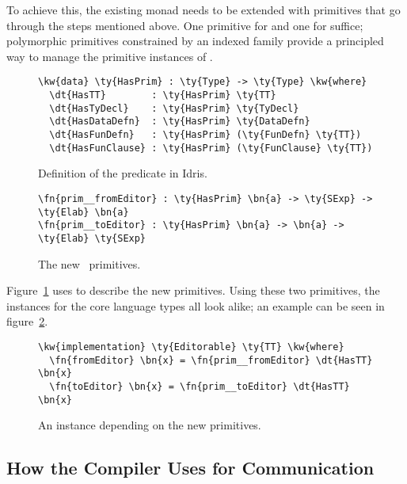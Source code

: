To achieve this, the existing \Elab{} monad needs to be extended with
primitives that go through the steps mentioned above.  One \Elab{} primitive
for  and one for  suffice; polymorphic
primitives constrained by an indexed family provide a principled
way to manage the primitive instances of \Editorable{}.

\begin{figure}
\begin{Verbatim}
\kw{data} \ty{HasPrim} : \ty{Type} -> \ty{Type} \kw{where}
  \dt{HasTT}        : \ty{HasPrim} \ty{TT}
  \dt{HasTyDecl}    : \ty{HasPrim} \ty{TyDecl}
  \dt{HasDataDefn}  : \ty{HasPrim} \ty{DataDefn}
  \dt{HasFunDefn}   : \ty{HasPrim} (\ty{FunDefn} \ty{TT})
  \dt{HasFunClause} : \ty{HasPrim} (\ty{FunClause} \ty{TT})
\end{Verbatim}
\caption{Definition of the  predicate in Idris.}
\end{figure}


\begin{figure}
\begin{Verbatim}
\fn{prim__fromEditor} : \ty{HasPrim} \bn{a} -> \ty{SExp} -> \ty{Elab} \bn{a}
\fn{prim__toEditor} : \ty{HasPrim} \bn{a} -> \bn{a} -> \ty{Elab} \ty{SExp}
\end{Verbatim}
  \caption{The new \Elab\ primitives.}
\label{code:newElabPrims}
\end{figure}

Figure~\ref{code:newElabPrims} uses  to describe the new \Elab{} primitives.
Using these two primitives, the \Editorable{} instances for the core language
types all look alike; an example can be seen in figure~\ref{fig:editorablePrim}.

\begin{figure}
\begin{Verbatim}
\kw{implementation} \ty{Editorable} \ty{TT} \kw{where}
  \fn{fromEditor} \bn{x} = \fn{prim__fromEditor} \dt{HasTT} \bn{x}
  \fn{toEditor} \bn{x} = \fn{prim__toEditor} \dt{HasTT} \bn{x}
\end{Verbatim}
\caption{An \Editorable{} instance depending on the new primitives.}
\label{fig:editorablePrim}
\end{figure}

\subsection{How the Compiler Uses \Editorable{} for Communication}
\label{ssec:communication}


